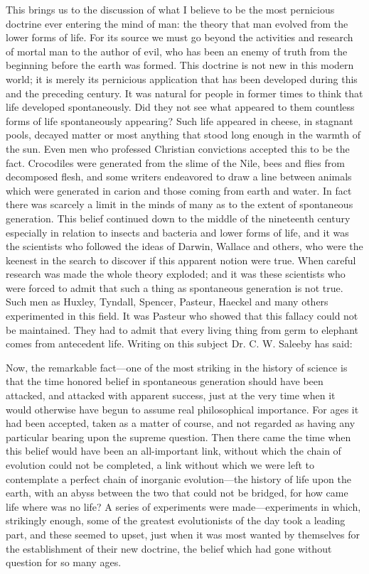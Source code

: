 This brings us to the discussion of what I believe to be the most pernicious doctrine ever
entering the mind of man: the theory that man evolved from the lower forms of life. For its
source we must go beyond the activities and research of mortal man to the author of evil,
who has been an enemy of truth from the beginning before the earth was formed. This
doctrine is not new in this modern world; it is merely its pernicious application that has been
developed during this and the preceding century. It was natural for people in former times to
think that life developed spontaneously. Did they not see what appeared to them countless
forms of life spontaneously appearing? Such life appeared in cheese, in stagnant pools,
decayed matter or most anything that stood long enough in the warmth of the sun. Even men
who professed Christian convictions accepted this to be the fact. Crocodiles were generated
from the slime of the Nile, bees and flies from decomposed flesh, and some writers
endeavored to draw a line between animals which were generated in carion and those coming
from earth and water. In fact there was scarcely a limit in the minds of many as to the extent
of spontaneous generation. This belief continued down to the middle of the nineteenth
century especially in relation to insects and bacteria and lower forms of life, and it was the
scientists who followed the ideas of Darwin, Wallace and others, who were the keenest in the
search to discover if this apparent notion were true. When careful research was made the
whole theory exploded; and it was these scientists who were forced to admit that such a thing
as spontaneous generation is not true. Such men as Huxley, Tyndall, Spencer, Pasteur,
Haeckel and many others experimented in this field. It was Pasteur who showed that this
fallacy could not be maintained. They had to admit that every living thing from germ to
elephant comes from antecedent life. Writing on this subject Dr. C. W. Saleeby has said:

Now, the remarkable fact—one of the most striking in the history of science is that the time
honored belief in spontaneous generation should have been attacked, and attacked with
apparent success, just at the very time when it would otherwise have begun to assume real
philosophical importance. For ages it had been accepted, taken as a matter of course, and not
regarded as having any particular bearing upon the supreme question. Then there came the
time when this belief would have been an all-important link, without which the chain of
evolution could not be completed, a link without which we were left to contemplate a perfect
chain of inorganic evolution—the history of life upon the earth, with an abyss between the
two that could not be bridged, for how came life where was no life? A series of experiments
were made—experiments in which, strikingly enough, some of the greatest evolutionists of
the day took a leading part, and these seemed to upset, just when it was most wanted by
themselves for the establishment of their new doctrine, the belief which had gone without
question for so many ages.

